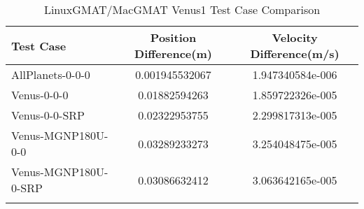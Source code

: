\begin{table}[htbp!]
\centering
\caption{ LinuxGMAT/MacGMAT Venus1 Test Case Comparison}
      \begin{tabular}{lcc}
      \hline\hline
          Test Case & Position Difference(m) & Velocity Difference(m/s) \\
         \hline
         AllPlanets-0-0-0 & 0.001945532067 & 1.947340584e-006 \\
         Venus-0-0-0 & 0.01882594263 & 1.859722326e-005 \\
         Venus-0-0-SRP & 0.02322953755 & 2.299817313e-005 \\
         Venus-MGNP180U-0-0 & 0.03289233273 & 3.254048475e-005 \\
         Venus-MGNP180U-0-SRP & 0.03086632412 & 3.063642165e-005 \\
      \hline\hline
      \label{Table: Venus1 LinuxGMAT-MacGMAT Table} 
\end{tabular}
\end{table}

